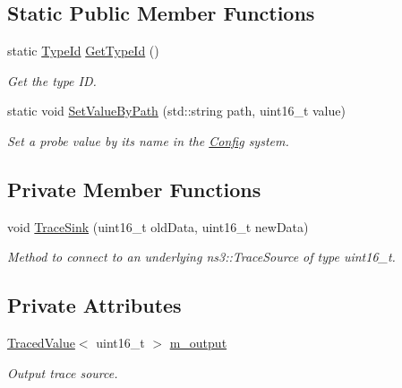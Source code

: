 \subsection*{Static Public Member Functions}
\begin{DoxyCompactItemize}
\item 
static \hyperlink{classns3_1_1TypeId}{Type\+Id} \hyperlink{classns3_1_1Uinteger16Probe_ac9e36b6d560839385c4769f1d2fceacb}{Get\+Type\+Id} ()
\begin{DoxyCompactList}\small\item\em Get the type ID. \end{DoxyCompactList}\item 
static void \hyperlink{classns3_1_1Uinteger16Probe_a642930d55354b294fc9ffc58b8cb964c}{Set\+Value\+By\+Path} (std\+::string path, uint16\+\_\+t value)
\begin{DoxyCompactList}\small\item\em Set a probe value by its name in the \hyperlink{namespacens3_1_1Config}{Config} system. \end{DoxyCompactList}\end{DoxyCompactItemize}
\subsection*{Private Member Functions}
\begin{DoxyCompactItemize}
\item 
void \hyperlink{classns3_1_1Uinteger16Probe_a50cca57a663bfed80b890d0954157a2c}{Trace\+Sink} (uint16\+\_\+t old\+Data, uint16\+\_\+t new\+Data)
\begin{DoxyCompactList}\small\item\em Method to connect to an underlying ns3\+::\+Trace\+Source of type uint16\+\_\+t. \end{DoxyCompactList}\end{DoxyCompactItemize}
\subsection*{Private Attributes}
\begin{DoxyCompactItemize}
\item 
\hyperlink{classns3_1_1TracedValue}{Traced\+Value}$<$ uint16\+\_\+t $>$ \hyperlink{classns3_1_1Uinteger16Probe_a564e98cfa593942428b2346c6926b3aa}{m\+\_\+output}
\begin{DoxyCompactList}\small\item\em Output trace source. \end{DoxyCompactList}\end{DoxyCompactItemize}
